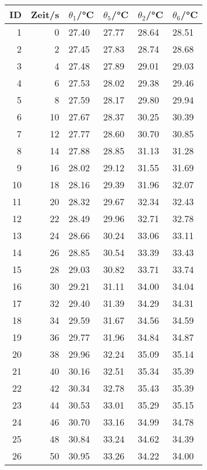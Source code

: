 \begin{longtable}{rrllll}
	\hline
	{ID}&{Zeit/\si{\second}} &{$\theta_{1}$/\si{\degreeCelsius}}&{$\theta_{5}$/\si{\degreeCelsius}}&{$\theta_{2}$/\si{\degreeCelsius}}&{$\theta_{6}$/\si{\degreeCelsius}}\\
	\hline
	\endhead
		1 & 0 & 27.40 & 27.77 & 28.64 & 28.51 \\ 
		2 & 2 & 27.45 & 27.83 & 28.74 & 28.68 \\ 
		3 & 4 & 27.48 & 27.89 & 29.01 & 29.03 \\ 
		4 & 6 & 27.53 & 28.02 & 29.38 & 29.46 \\ 
		5 & 8 & 27.59 & 28.17 & 29.80 & 29.94 \\ 
		6 & 10 & 27.67 & 28.37 & 30.25 & 30.39 \\ 
		7 & 12 & 27.77 & 28.60 & 30.70 & 30.85 \\ 
		8 & 14 & 27.88 & 28.85 & 31.13 & 31.28 \\ 
		9 & 16 & 28.02 & 29.12 & 31.55 & 31.69 \\ 
		10 & 18 & 28.16 & 29.39 & 31.96 & 32.07 \\ 
		11 & 20 & 28.32 & 29.67 & 32.34 & 32.43 \\ 
		12 & 22 & 28.49 & 29.96 & 32.71 & 32.78 \\ 
		13 & 24 & 28.66 & 30.24 & 33.06 & 33.11 \\ 
		14 & 26 & 28.85 & 30.54 & 33.39 & 33.43 \\ 
		15 & 28 & 29.03 & 30.82 & 33.71 & 33.74 \\ 
		16 & 30 & 29.21 & 31.11 & 34.00 & 34.04 \\ 
		17 & 32 & 29.40 & 31.39 & 34.29 & 34.31 \\ 
		18 & 34 & 29.59 & 31.67 & 34.56 & 34.59 \\ 
		19 & 36 & 29.77 & 31.96 & 34.84 & 34.87 \\ 
		20 & 38 & 29.96 & 32.24 & 35.09 & 35.14 \\ 
		21 & 40 & 30.16 & 32.51 & 35.34 & 35.39 \\ 
		22 & 42 & 30.34 & 32.78 & 35.43 & 35.39 \\ 
		23 & 44 & 30.53 & 33.01 & 35.29 & 35.15 \\ 
		24 & 46 & 30.70 & 33.16 & 34.99 & 34.78 \\ 
		25 & 48 & 30.84 & 33.24 & 34.62 & 34.39 \\ 
		26 & 50 & 30.95 & 33.26 & 34.22 & 34.00 \\ 

\end{longtable}
